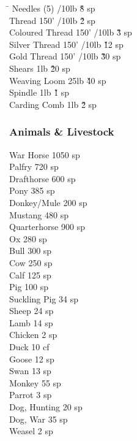 \begin{multicols}{3}
{\begin{tabbing}
\hspace{0.8\linewidth}\= \kill
Needles (5)				/10lb	\' \` 8 sp \\
Thread 150'				/10lb	\' \` 2 sp \\
Coloured Thread 150'			/10lb	\' \` 3 sp \\
Silver Thread 150'			/10lb	\' \` 12 sp \\
Gold Thread 150'			/10lb	\' \` 30 sp \\
Shears					\> 1lb		\' \` 20 sp \\
Weaving Loom				\> 25lb		\' \` 40 sp \\
Spindle					\> 1lb		\' \` 1 sp \\
Carding Comb				\> 1lb		\' \` 2 sp \\
\end{tabbing}

\subsubsection{Animals \& Livestock}

War Horse			\hfill 1050 sp \\
Palfry				\hfill 720 sp \\
Drafthorse			\hfill 600 sp \\
Pony				\hfill 385 sp \\
Donkey/Mule			\hfill 200 sp \\
Mustang				\hfill 480 sp \\
Quarterhorse			\hfill 900 sp \\
Ox				\hfill 280 sp \\
Bull				\hfill 300 sp \\
Cow				\hfill 250 sp \\
Calf				\hfill 125 sp \\
Pig				\hfill 100 sp \\
Suckling Pig			\hfill 34 sp \\
Sheep				\hfill 24 sp \\
Lamb				\hfill 14 sp \\
Chicken				\hfill 2 sp \\
Duck				\hfill 10 cf \\
Goose				\hfill 12 sp \\
Swan				\hfill 13 sp \\
Monkey				\hfill 55 sp \\
Parrot				\hfill 3 sp \\
Dog, Hunting			\hfill 20 sp \\
Dog, War			\hfill 35 sp \\
Weasel				\hfill 2 sp \\
}

\end{multicols}
